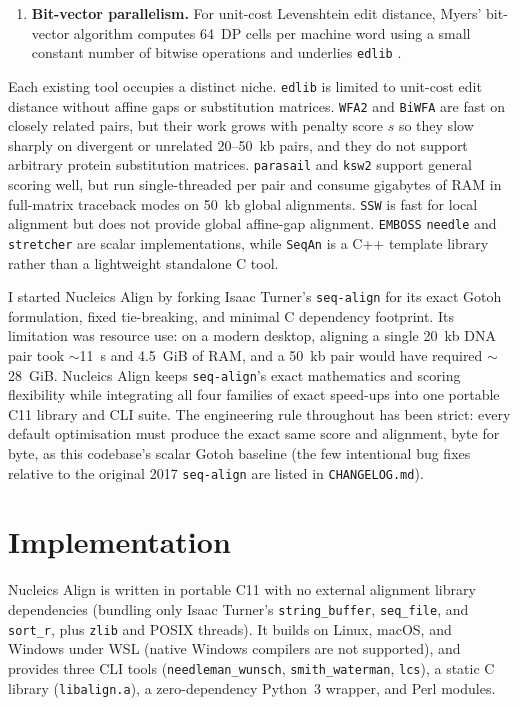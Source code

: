 \documentclass[11pt,a4paper]{article}
\begin{document}
\begin{enumerate}
  \item \textbf{Bit-vector parallelism.} For unit-cost Levenshtein edit distance, Myers' bit-vector algorithm \citep{myers1999fast} computes 64~DP cells per machine word using a small constant number of bitwise operations and underlies \texttt{edlib} \citep{sosic2017edlib}.
\end{enumerate}

Each existing tool occupies a distinct niche. \texttt{edlib} \citep{sosic2017edlib} is limited to unit-cost edit distance without affine gaps or substitution matrices. \texttt{WFA2} and \texttt{BiWFA} \citep{marcosola2021fast,marcosola2023optimal} are fast on closely related pairs, but their work grows with penalty score $s$ so they slow sharply on divergent or unrelated 20--50~kb pairs, and they do not support arbitrary protein substitution matrices. \texttt{parasail} \citep{daily2016parasail} and \texttt{ksw2} \citep{li2018minimap2} support general scoring well, but run single-threaded per pair and consume gigabytes of RAM in full-matrix traceback modes on 50~kb global alignments. \texttt{SSW} \citep{zhao2013ssw} is fast for local alignment but does not provide global affine-gap alignment. \texttt{EMBOSS} \texttt{needle} and \texttt{stretcher} \citep{rice2000emboss} are scalar implementations, while \texttt{SeqAn} \citep{rahn2018seqan} is a C++ template library rather than a lightweight standalone C tool.

I started Nucleics Align by forking Isaac Turner's \texttt{seq-align} \citep{turner2017seqalign} for its exact Gotoh formulation, fixed tie-breaking, and minimal C dependency footprint. Its limitation was resource use: on a modern desktop, aligning a single 20~kb DNA pair took $\sim$11~s and 4.5~GiB of RAM, and a 50~kb pair would have required $\sim$28~GiB. Nucleics Align keeps \texttt{seq-align}'s exact mathematics and scoring flexibility while integrating all four families of exact speed-ups into one portable C11 library and CLI suite. The engineering rule throughout has been strict: every default optimisation must produce the exact same score and alignment, byte for byte, as this codebase's scalar Gotoh baseline (the few intentional bug fixes relative to the original 2017 \texttt{seq-align} are listed in \texttt{CHANGELOG.md}).

\section{Implementation}

Nucleics Align is written in portable C11 with no external alignment library dependencies (bundling only Isaac Turner's \texttt{string\_buffer}, \texttt{seq\_file}, and \texttt{sort\_r}, plus \texttt{zlib} and POSIX threads). It builds on Linux, macOS, and Windows under WSL (native Windows compilers are not supported), and provides three CLI tools (\texttt{needleman\_wunsch}, \texttt{smith\_waterman}, \texttt{lcs}), a static C library (\texttt{libalign.a}), a zero-dependency Python~3 wrapper, and Perl modules.
\end{document}
